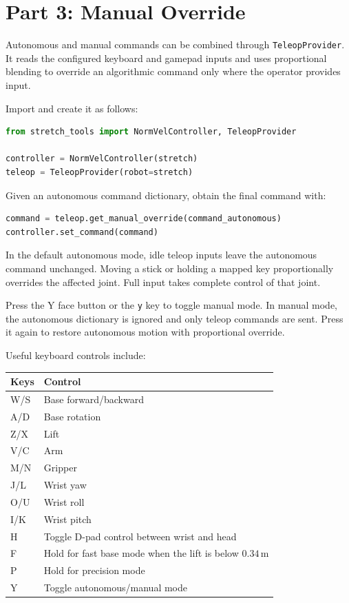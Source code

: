 \documentclass[11pt,a4paper]{article}
\begin{document}
\section{Part 3: Manual Override}

Autonomous and manual commands can be combined through
\texttt{TeleopProvider}. It reads the configured keyboard and gamepad inputs and
uses proportional blending to override an algorithmic command only where the
operator provides input.

Import and create it as follows:

\begin{lstlisting}[language=Python]
from stretch_tools import NormVelController, TeleopProvider

controller = NormVelController(stretch)
teleop = TeleopProvider(robot=stretch)
\end{lstlisting}

Given an autonomous command dictionary, obtain the final command with:

\begin{lstlisting}[language=Python]
command = teleop.get_manual_override(command_autonomous)
controller.set_command(command)
\end{lstlisting}

In the default autonomous mode, idle teleop inputs leave the autonomous command
unchanged. Moving a stick or holding a mapped key proportionally overrides the
affected joint. Full input takes complete control of that joint.

Press the Y face button or the \texttt{y} key to toggle manual mode. In manual
mode, the autonomous dictionary is ignored and only teleop commands are sent.
Press it again to restore autonomous motion with proportional override.

Useful keyboard controls include:

\begin{center}
\begin{tabular}{|l|l|}
\hline
\textbf{Keys} & \textbf{Control} \\
\hline
W/S & Base forward/backward \\
A/D & Base rotation \\
Z/X & Lift \\
V/C & Arm \\
M/N & Gripper \\
J/L & Wrist yaw \\
O/U & Wrist roll \\
I/K & Wrist pitch \\
H & Toggle D-pad control between wrist and head \\
F & Hold for fast base mode when the lift is below $0.34\,\text{m}$ \\
P & Hold for precision mode \\
Y & Toggle autonomous/manual mode \\
\hline
\end{tabular}
\end{center}
\end{document}
